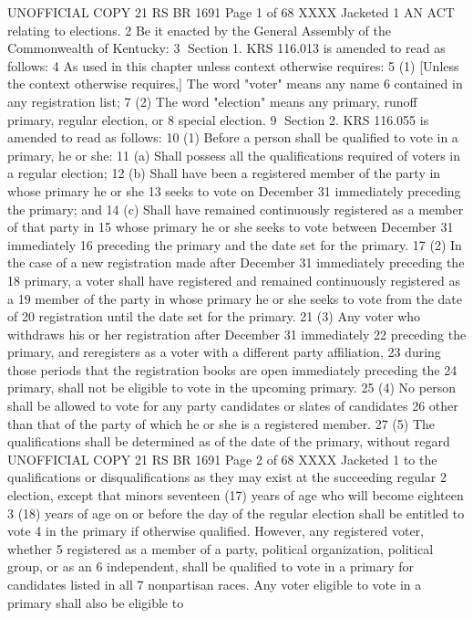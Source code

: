 UNOFFICIAL COPY 21 RS BR 1691
Page 1 of 68
XXXX Jacketed
1 AN ACT relating to elections.
2 Be it enacted by the General Assembly of the Commonwealth of Kentucky:
3 Section 1. KRS 116.013 is amended to read as follows:
4 As used in this chapter unless context otherwise requires:
5 (1) [Unless the context otherwise requires,] The word "voter" means any name
6 contained in any registration list;
7 (2) The word "election" means any primary, runoff primary, regular election, or
8 special election.
9 Section 2. KRS 116.055 is amended to read as follows:
10 (1) Before a person shall be qualified to vote in a primary, he or she:
11 (a) Shall possess all the qualifications required of voters in a regular election;
12 (b) Shall have been a registered member of the party in whose primary he or she
13 seeks to vote on December 31 immediately preceding the primary; and
14 (c) Shall have remained continuously registered as a member of that party in
15 whose primary he or she seeks to vote between December 31 immediately
16 preceding the primary and the date set for the primary.
17 (2) In the case of a new registration made after December 31 immediately preceding the
18 primary, a voter shall have registered and remained continuously registered as a
19 member of the party in whose primary he or she seeks to vote from the date of
20 registration until the date set for the primary.
21 (3) Any voter who withdraws his or her registration after December 31 immediately
22 preceding the primary, and reregisters as a voter with a different party affiliation,
23 during those periods that the registration books are open immediately preceding the
24 primary, shall not be eligible to vote in the upcoming primary.
25 (4) No person shall be allowed to vote for any party candidates or slates of candidates
26 other than that of the party of which he or she is a registered member.
27 (5) The qualifications shall be determined as of the date of the primary, without regard 
UNOFFICIAL COPY 21 RS BR 1691
Page 2 of 68
XXXX Jacketed
1 to the qualifications or disqualifications as they may exist at the succeeding regular
2 election, except that minors seventeen (17) years of age who will become eighteen
3 (18) years of age on or before the day of the regular election shall be entitled to vote
4 in the primary if otherwise qualified. However, any registered voter, whether
5 registered as a member of a party, political organization, political group, or as an
6 independent, shall be qualified to vote in a primary for candidates listed in all
7 nonpartisan races. Any voter eligible to vote in a primary shall also be eligible to
